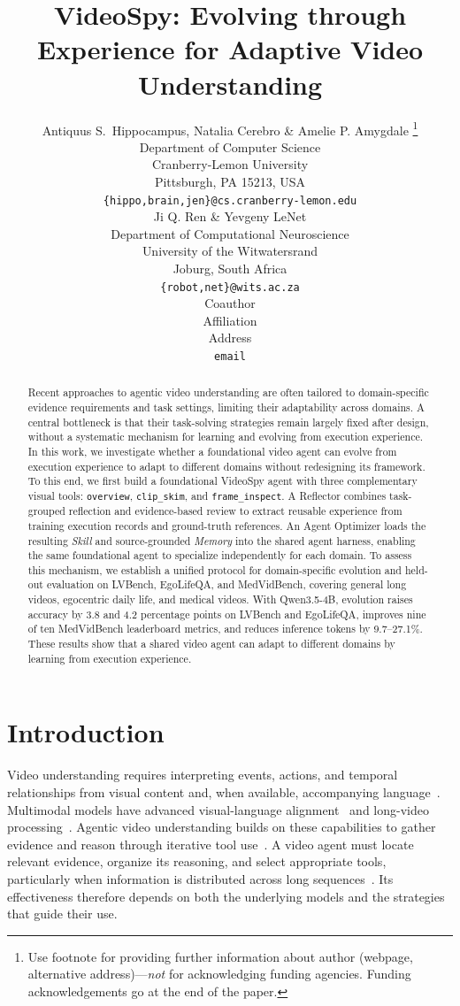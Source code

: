 \documentclass{article} %
\title{VideoSpy: Evolving through Experience for Adaptive Video Understanding}
\author{Antiquus S.~Hippocampus, Natalia Cerebro \& Amelie P. Amygdale \thanks{ Use footnote for providing further information
about author (webpage, alternative address)---\emph{not} for acknowledging
funding agencies.  Funding acknowledgements go at the end of the paper.} \\
Department of Computer Science\\
Cranberry-Lemon University\\
Pittsburgh, PA 15213, USA \\
\texttt{\{hippo,brain,jen\}@cs.cranberry-lemon.edu} \\
\And
Ji Q. Ren \& Yevgeny LeNet \\
Department of Computational Neuroscience \\
University of the Witwatersrand \\
Joburg, South Africa \\
\texttt{\{robot,net\}@wits.ac.za} \\
\AND
Coauthor \\
Affiliation \\
Address \\
\texttt{email}
}
\begin{document}
\maketitle

\begin{abstract}
Recent approaches to agentic video understanding are often tailored to domain-specific evidence requirements and task settings, limiting their adaptability across domains. A central bottleneck is that their task-solving strategies remain largely fixed after design, without a systematic mechanism for learning and evolving from execution experience. In this work, we investigate whether a foundational video agent can evolve from execution experience to adapt to different domains without redesigning its framework. To this end, we first build a foundational VideoSpy agent with three complementary visual tools: \texttt{overview}, \texttt{clip\_skim}, and \texttt{frame\_inspect}. A Reflector combines task-grouped reflection and evidence-based review to extract reusable experience from training execution records and ground-truth references. An Agent Optimizer loads the resulting \textit{Skill} and source-grounded \textit{Memory} into the shared agent harness, enabling the same foundational agent to specialize independently for each domain. To assess this mechanism, we establish a unified protocol for domain-specific evolution and held-out evaluation on LVBench, EgoLifeQA, and MedVidBench, covering general long videos, egocentric daily life, and medical videos. With Qwen3.5-4B, evolution raises accuracy by 3.8 and 4.2 percentage points on LVBench and EgoLifeQA, improves nine of ten MedVidBench leaderboard metrics, and reduces inference tokens by 9.7--27.1\%. These results show that a shared video agent can adapt to different domains by learning from execution experience.
\end{abstract}

\section{Introduction}

Video understanding requires interpreting events, actions, and temporal relationships from visual content and, when available, accompanying language~\citep{huang2024lita,fu2025videomme}. Multimodal models have advanced visual-language alignment~\citep{lin2024videollava,bai2025qwen3vl} and long-video processing~\citep{shen2025longvu}. Agentic video understanding builds on these capabilities to gather evidence and reason through iterative tool use~\citep{wang2025videoagent,fan2025videoagent,jeoung2024avua}. A video agent must locate relevant evidence, organize its reasoning, and select appropriate tools, particularly when information is distributed across long sequences~\citep{zhang2025dvd,lin2026videoseek}. Its effectiveness therefore depends on both the underlying models and the strategies that guide their use.
\end{document}
